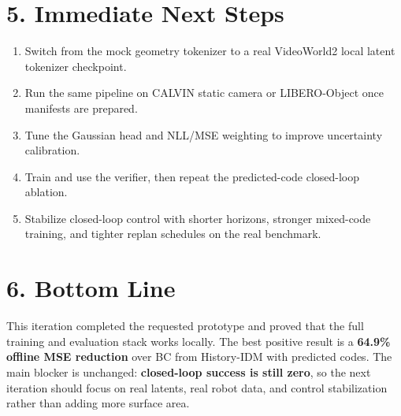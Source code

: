 \documentclass[11pt]{article}
\newcommand{\improve}[1]{\textcolor{BrickRed}{#1}}
\begin{document}
\section*{5. Immediate Next Steps}

\begin{enumerate}[leftmargin=1.4em]
    \item \improve{Switch from the mock geometry tokenizer to a real VideoWorld2 local latent tokenizer checkpoint.}
    \item \improve{Run the same pipeline on CALVIN static camera or LIBERO-Object once manifests are prepared.}
    \item \improve{Tune the Gaussian head and NLL/MSE weighting to improve uncertainty calibration.}
    \item \improve{Train and use the verifier, then repeat the predicted-code closed-loop ablation.}
    \item \improve{Stabilize closed-loop control with shorter horizons, stronger mixed-code training, and tighter replan schedules on the real benchmark.}
\end{enumerate}

\section*{6. Bottom Line}

This iteration completed the requested prototype and proved that the full training and evaluation stack works locally.
The best positive result is a \textbf{64.9\% offline MSE reduction} over BC from History-IDM with predicted codes.
The main blocker is unchanged: \textbf{closed-loop success is still zero}, so the next iteration should focus on real latents, real robot data, and control stabilization rather than adding more surface area.
\end{document}
